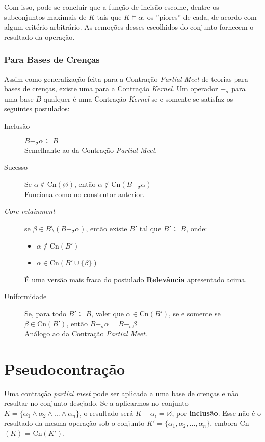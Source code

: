 Com isso, pode-se concluir que a função de incisão escolhe, dentre os subconjuntos maximais de $ K $ tais que $ K \models \alpha $, os ''piores'' de cada, de acordo com algum critério arbitrário. As remoções desses escolhidos do conjunto fornecem o resultado da operação.

\subsubsection{Para Bases de Crenças}

Assim como generalização feita para a Contração \textit{Partial Meet} de teorias para bases de crenças, existe uma para a Contração \textit{Kernel}. Um operador $ -_{\sigma} $ para uma base $ B $ qualquer é uma Contração \textit{Kernel} se e somente se satisfaz os seguintes postulados:

\begin{description}
	\item[Inclusão] $ B -_{\sigma} \alpha \subseteq B$ \\ Semelhante ao da Contração \textit{Partial Meet}.
	\item[Sucesso] Se $ \alpha \notin \text{Cn}(\varnothing) $, então $ \alpha \notin \text{Cn}(B -_{\sigma} \alpha) $ \\ Funciona como no construtor anterior.
	\item[\textit{Core-retainment}] se $ \beta \in B \setminus (B -_{\sigma} \alpha) $, então existe $ B' \text{ tal que } B' \subseteq B $, onde:
	\begin{itemize}
		\item $ \alpha \notin \text{Cn}(B') $
		\item $ \alpha \in \text{Cn}(B' \cup \{\beta\}) $ 
	\end{itemize}
	É uma versão mais fraca do postulado \textbf{Relevância} apresentado acima.
	\item[Uniformidade] Se, para todo $ B' \subseteq B $, valer que $ \alpha \in \text{Cn}(B') $, se e somente se $ \beta \in \text{Cn}(B') $, então $ B -_{\sigma} \alpha = B -_{\sigma} \beta $ \\
	Análogo ao da Contração \textit{Partial Meet}. 
\end{description}

\section{Pseudocontração}

Uma contração \textit{partial meet} pode ser aplicada a uma base de crenças e não resultar no conjunto desejado. Se a aplicarmos no conjunto $ K = \{\alpha_1 \land \alpha_2 \land ... \land \alpha_n\} $, o resultado será $ K - \alpha_i = \varnothing $, por \textbf{inclusão}. Esse não é o resultado da mesma operação sob o conjunto $ K' = \{\alpha_1, \alpha_2, ..., \alpha_n\} $, embora Cn$(K)$ = Cn$(K')$.
	
